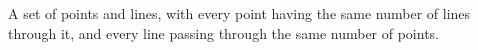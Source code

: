  A set of points and lines, with every point having the
same number of lines through it, and every line passing
through the same number of points.
